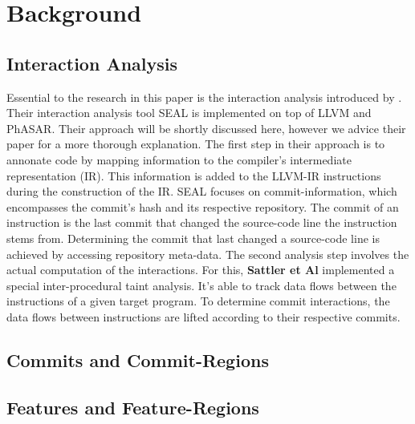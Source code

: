 \section*{Background}\label{ch:background}

\subsection*{Interaction Analysis}

Essential to the research in this paper is the interaction analysis introduced by \citet{sattler2023seal}.
Their interaction analysis tool SEAL is implemented on top of LLVM and PhASAR.
Their approach will be shortly discussed here, however we advice their paper for a more thorough explanation.
The first step in their approach is to annonate code by mapping information to the compiler's intermediate representation (IR).
This information is added to the LLVM-IR instructions during the construction of the IR.
SEAL focuses on commit-information, which encompasses the commit's hash and its respective repository.
The commit of an instruction is the last commit that changed the source-code line the instruction stems from.
Determining the commit that last changed a source-code line is achieved by accessing repository meta-data.
The second analysis step involves the actual computation of the interactions.
For this, \textbf{Sattler et Al} implemented a special inter-procedural taint analysis.
It's able to track data flows between the instructions of a given target program.
To determine commit interactions, the data flows between instructions are lifted according to their respective commits.

\subsection*{Commits and Commit-Regions}

\subsection*{Features and Feature-Regions}

